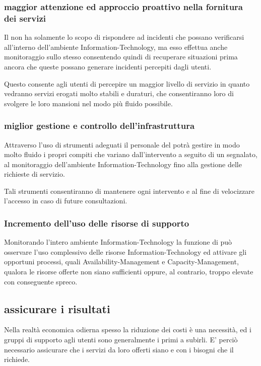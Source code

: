 \subsubsection[Maggior attenzione ed approccio proattivo nella fonrnitura dei servizi]{maggior attenzione ed approccio proattivo nella fornitura dei servizi}
Il  non ha solamente lo scopo di rispondere ad incidenti che possano verificarsi all'interno dell'ambiente \acs{Information-Technology}, ma esso effettua anche monitoraggio sullo stesso consentendo quindi di recuperare situazioni prima ancora che queste possano generare incidenti percepiti dagli utenti.

Questo consente agli utenti di percepire un maggior livello di servizio in quanto vedranno servizi erogati molto stabili e duraturi, che consentiranno loro di svolgere le loro mansioni nel modo più fluido possibile.

\subsubsection[Miglior gestione e controllo dell'infrastruttura]{miglior gestione e controllo dell'infrastruttura}
Attraverso l'uso di strumenti adeguati il personale del  potrà gestire in modo molto fluido i propri compiti che variano dall'intervento a seguito di un  segnalato, al monitoraggio dell'ambiente \acs{Information-Technology} fino alla gestione delle richieste di servizio.

Tali strumenti consentiranno di mantenere ogni intervento  e  al fine di velocizzare l'accesso in caso di future consultazioni.

\subsubsection[Incremento dell'uso delle risorse di supporto]{Incremento dell'uso delle risorse di supporto}
Monitorando l'intero ambiente \acs{Information-Technology} la funzione di  può osservare l'uso complessivo delle risorse \acs{Information-Technology} ed attivare gli opportuni processi, quali \ac{Availability-Management} e \ac{Capacity-Management}, qualora le risorse offerte non siano sufficienti oppure, al contrario, troppo elevate con conseguente spreco.

\subsection[Assicurare i risultati]{assicurare i risultati}
\label{sd-ensuring-results}
Nella realtà economica odierna spesso la riduzione dei costi è una necessità, ed i gruppi di supporto agli utenti sono generalmente i primi a subirli. E' perciò necessario assicurare che i servizi da loro offerti siano  e  con i bisogni che il  richiede.


